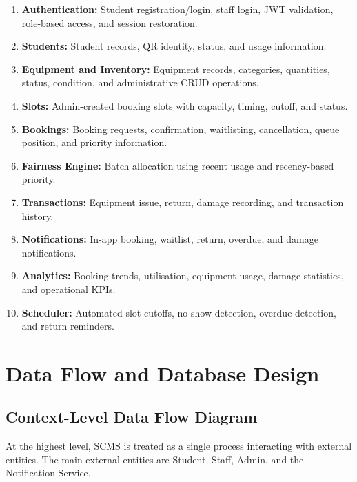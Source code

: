 \documentclass[12pt,a4paper,oneside]{report}
\begin{document}
\begin{enumerate}
    \item \textbf{Authentication:} Student registration/login, staff login, JWT validation, role-based access, and session restoration.
    \item \textbf{Students:} Student records, QR identity, status, and usage information.
    \item \textbf{Equipment and Inventory:} Equipment records, categories, quantities, status, condition, and administrative CRUD operations.
    \item \textbf{Slots:} Admin-created booking slots with capacity, timing, cutoff, and status.
    \item \textbf{Bookings:} Booking requests, confirmation, waitlisting, cancellation, queue position, and priority information.
    \item \textbf{Fairness Engine:} Batch allocation using recent usage and recency-based priority.
    \item \textbf{Transactions:} Equipment issue, return, damage recording, and transaction history.
    \item \textbf{Notifications:} In-app booking, waitlist, return, overdue, and damage notifications.
    \item \textbf{Analytics:} Booking trends, utilisation, equipment usage, damage statistics, and operational KPIs.
    \item \textbf{Scheduler:} Automated slot cutoffs, no-show detection, overdue detection, and return reminders.
\end{enumerate}

\chapter{Data Flow and Database Design}

\section{Context-Level Data Flow Diagram}

At the highest level, SCMS is treated as a single process interacting with external entities. The main external entities are Student, Staff, Admin, and the Notification Service.
\end{document}
